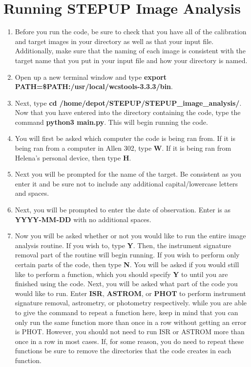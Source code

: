 \documentclass[11pt]{report}
\begin{document}
\chapter{Running STEPUP Image Analysis}
\begin{enumerate}
\item Before you run the code, be sure to check that you have all of the calibration and target images in your directory as well as that your input file. Additionally, make sure that the naming of each image is consistent with the target name that you put in your input file and how your directory is named.
\item Open up a new terminal window and type {\bf export PATH=\$PATH:/usr/local/wcstools-3.3.3/bin}.
\item Next, type {\bf cd /home/depot/STEPUP/STEPUP\_image}{\bf\_analysis/}. Now that you have entered into the directory containing the code, type the command {\bf python3 main.py}. This will begin running the code.
\item You will first be asked which computer the code is being ran from. If it is being ran from a computer in Allen 302, type {\bf W}. If it is being ran from Helena's personal device, then type {\bf H}.
\item Next you will be prompted for the name of the target. Be consistent as you enter it and be sure not to include any additional capital/lowercase letters and spaces.
\item Next, you will be prompted to enter the date of observation. Enter is as {\bf YYYY-MM-DD} with no additional spaces.
\item Now you will be asked whether or not you would like to run the entire image analysis routine. If you wish to, type {\bf Y}. Then, the instrument signature removal part of the routine will begin running. If you wish to perform only certain parts of the code, then type {\bf N}. You will be asked if you would still like to perform a function, which you should specify {\bf Y} to until you are finished using the code. Next, you will be asked what part of the code you would like to run. Enter {\bf ISR}, {\bf ASTROM}, or {\bf PHOT} to perform instrument signature removal, astrometry, or photometry respectively. 
 while you are able to give the command to repeat a function here, keep in mind that you can only run the same function more than once in a row without getting an error is PHOT. However, you should not need to run ISR or ASTROM more than once in a row in most cases. If, for some reason, you do need to repeat these functions be sure to remove the directories that the code creates in each function. 

\end{enumerate}
\end{document}
